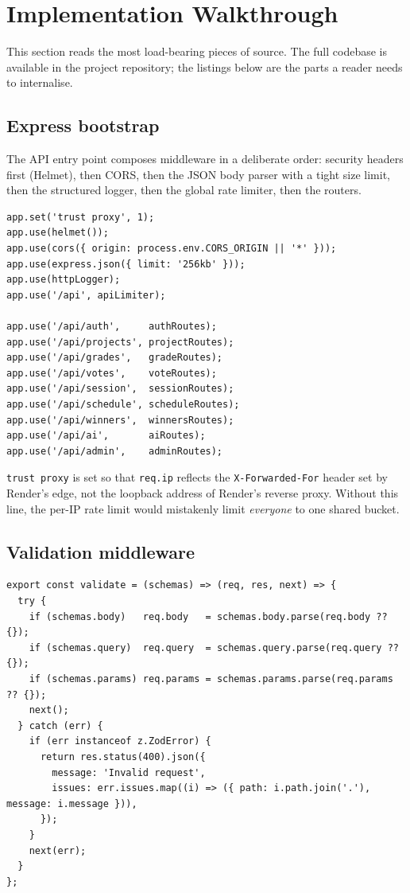 \section{Implementation Walkthrough}
\label{sec:impl}

This section reads the most load-bearing pieces of source. The full
codebase is available in the project repository; the listings below are
the parts a reader needs to internalise.

\subsection{Express bootstrap}

The API entry point composes middleware in a deliberate order: security
headers first (Helmet), then CORS, then the JSON body parser with a tight
size limit, then the structured logger, then the global rate limiter,
then the routers.

\begin{lstlisting}[caption={\texttt{server/server.js} (key fragment)},label={lst:server}]
app.set('trust proxy', 1);
app.use(helmet());
app.use(cors({ origin: process.env.CORS_ORIGIN || '*' }));
app.use(express.json({ limit: '256kb' }));
app.use(httpLogger);
app.use('/api', apiLimiter);

app.use('/api/auth',     authRoutes);
app.use('/api/projects', projectRoutes);
app.use('/api/grades',   gradeRoutes);
app.use('/api/votes',    voteRoutes);
app.use('/api/session',  sessionRoutes);
app.use('/api/schedule', scheduleRoutes);
app.use('/api/winners',  winnersRoutes);
app.use('/api/ai',       aiRoutes);
app.use('/api/admin',    adminRoutes);
\end{lstlisting}

\texttt{trust proxy} is set so that \texttt{req.ip} reflects the
\texttt{X-Forwarded-For} header set by Render's edge, not the loopback
address of Render's reverse proxy. Without this line, the per-IP rate
limit would mistakenly limit \emph{everyone} to one shared bucket.

\subsection{Validation middleware}

\begin{lstlisting}[caption={\texttt{server/middleware/validate.js}; the generic validator},label={lst:validate}]
export const validate = (schemas) => (req, res, next) => {
  try {
    if (schemas.body)   req.body   = schemas.body.parse(req.body ?? {});
    if (schemas.query)  req.query  = schemas.query.parse(req.query ?? {});
    if (schemas.params) req.params = schemas.params.parse(req.params ?? {});
    next();
  } catch (err) {
    if (err instanceof z.ZodError) {
      return res.status(400).json({
        message: 'Invalid request',
        issues: err.issues.map((i) => ({ path: i.path.join('.'), message: i.message })),
      });
    }
    next(err);
  }
};
\end{lstlisting}

